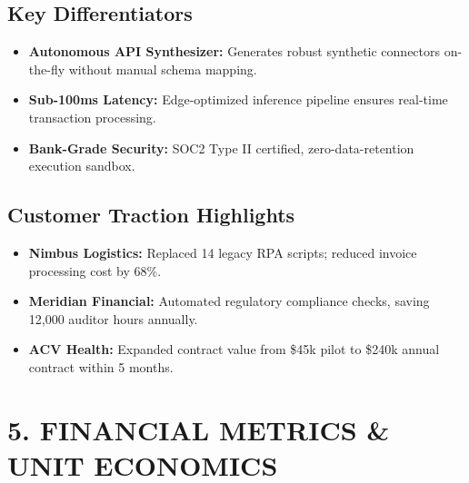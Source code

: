 \documentclass[10pt,a4paper]{article}
\begin{document}
\begin{minipage}[t]{0.48\textwidth}
  \subsection*{Key Differentiators}
  \begin{itemize}
    \item \textbf{Autonomous API Synthesizer:} Generates robust synthetic connectors on-the-fly without manual schema mapping.
    \item \textbf{Sub-100ms Latency:} Edge-optimized inference pipeline ensures real-time transaction processing.
    \item \textbf{Bank-Grade Security:} SOC2 Type II certified, zero-data-retention execution sandbox.
  \end{itemize}
\end{minipage}%
\hfill
\begin{minipage}[t]{0.49\textwidth}
  \subsection*{Customer Traction Highlights}
  \begin{itemize}
    \item \textbf{Nimbus Logistics:} Replaced 14 legacy RPA scripts; reduced invoice processing cost by 68\%.
    \item \textbf{Meridian Financial:} Automated regulatory compliance checks, saving 12,000 auditor hours annually.
    \item \textbf{ACV Health:} Expanded contract value from \$45k pilot to \$240k annual contract within 5 months.
  \end{itemize}
\end{minipage}

\newpage

\section*{5. FINANCIAL METRICS \& UNIT ECONOMICS}
\end{document}
